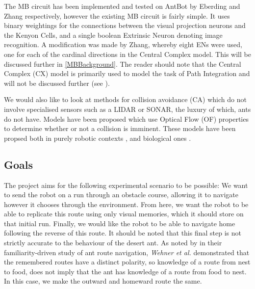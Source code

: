 \documentclass[a4paper,12pt]{article}
\begin{document}
The MB circuit has been implemented and tested on AntBot by Eberding and Zhang respectively, however
the existing MB circuit is fairly simple. It uses binary weightings for the connections between
the visual projection neurons and the Kenyon Cells, and a single boolean Extrinsic Neuron denoting
image recognition. A modification was made by Zhang, whereby eight ENs were used, one for each of
the cardinal directions in the Central Complex model. This will be discussed further in
\ref{MBBackground}. The reader should note that the Central Complex (CX) model is primarily used
to model the task of Path Integration and will not be discussed further (see \cite{Scimeca2017}).
\newline

We would also like to look at methods for collision avoidance (CA) which do not involve specialised
sensors such as a LIDAR or SONAR, the luxury of which, ants do not have. Models have been proposed
which use Optical Flow (OF) properties to determine whether or not a collision is imminent. These
models have been propsed both in purely robotic contexts \cite{Souhila2007},
and biological ones \cite{Low2005}. 
  
\subsection { Goals }

The project aims for the following experimental scenario to be possible: We want to send the robot
on a run through an obstacle course, allowing it to navigate however it chooses through the
environment. From here, we want the robot to be able to replicate this route using only visual
memories, which it should store on that initial run. Finally, we would like the robot to be able to 
navigate home following the reverse of this route. It should be noted that this final step is not
strictly accurate to the behaviour of the desert ant. As noted by \cite{Baddeley2012} in their
familiarity-driven study of ant route navigation, \textit{Wehner et al.} \cite{Wehner2006}
demonstrated that the remembered routes have a distinct polarity, so knowledge of a route from
nest to food, does not imply that the ant has knowledge of a route from food to nest. In this case,
we make the outward and homeward route the same.
\newline
\end{document}
